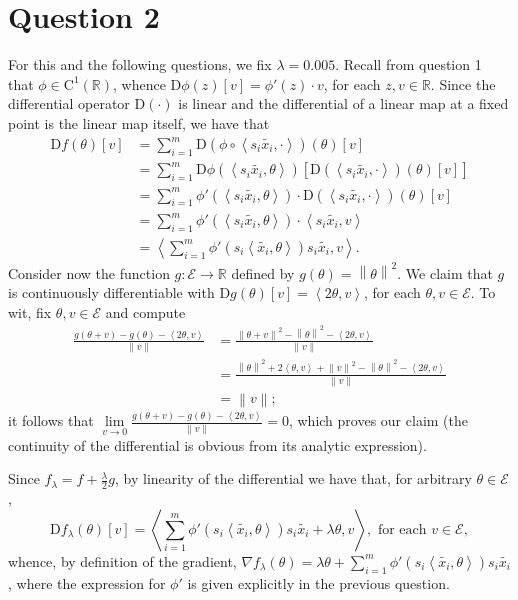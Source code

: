 \documentclass{article}
\theoremstyle{definition}
\theoremstyle{remark}
\newcommand{\R}{\mathbb{R}}
\newcommand \norm[1]{\left\lVert #1 \right\rVert}
\newcommand\inn [2]{\left\langle #1{,}#2\right\rangle}
\newcommand{\D}{\mathrm D}
\begin{document}
\section*{Question 2}
For this and the following questions, we  fix $\lambda=0.005$.
Recall from question 1 that $\phi\in \mathrm C^1(\R)$, whence $\D \phi (z)[v]=\phi'(z)\cdot v$, for each $z,v\in \R$.
Since the differential operator $\D(\cdot)$ is linear and the differential of a linear map at a fixed point is the linear map itself, we have that
\begin{align*}
  \D f(\theta)[v] &= \sum_{i=1}^m  \D \left( \phi\circ \inn{s_i\tilde{x_i}}{\cdot} \right)(\theta)[v]\\
  &= \sum_{i=1}^m  \D \phi(\inn{s_i\tilde{x_i}}{\theta}) 
\left[ \D (\inn{s_i\tilde{x_i}}{\cdot})(\theta)[v] \right]\\
&= \sum_{i=1}^m   \phi'(\inn{s_i\tilde{x_i}}{\theta}) \cdot
 \D (\inn{s_i\tilde{x_i}}{\cdot})(\theta)[v] \\
&=  \sum_{i=1}^m   \phi'(\inn{s_i\tilde{x_i}}{\theta}) \cdot
  \inn{s_i\tilde{x_i}}{v}\\
  &=\inn{\sum_{i=1}^m  \phi'(s_i\inn{\tilde{x_i}}{\theta})s_i\tilde{x_i}}{v}.
\end{align*}
Consider now the function $g\colon \mathcal E\to \R$ defined by $g(\theta)=\norm \theta^2$. We claim that $g$ is continuously differentiable with $\D g(\theta)[v]=\inn {2\theta}{v}$, for each $\theta,v\in \mathcal E$. To wit, fix  $\theta,v\in \mathcal E$ and compute
\begin{align*}
\frac{g(\theta+v)-g(\theta)-\inn{2\theta}{v}}{\norm v} &= \frac{\norm{\theta+v}^2-\norm{\theta}^2-\inn{2\theta}{v}}{\norm v}\\
&=\frac{\norm \theta^2 +2\inn {\theta}{v}+\norm v^2-\norm \theta^2-\inn{2\theta}{v}}{\norm v}\\
&=\norm v;
\end{align*}
it follows that $\lim\limits_{v\to 0}\frac{g(\theta+v)-g(\theta)-\inn{2\theta}{v}}{\norm v}=0$, which proves our claim (the continuity of the differential is obvious from its analytic expression).

Since $f_\lambda=f+\frac \lambda 2 g$, by linearity of the differential we have that, for arbitrary $\theta\in \mathcal E$,
$$
\D f_\lambda(\theta)[v]=\inn{\sum_{i=1}^m   \phi'(s_i\inn{\tilde{x_i}}{\theta})s_i\tilde{x_i}+\lambda\theta}{v}, \text{ for each }v\in \mathcal E,
$$
whence, by definition of the gradient, $\nabla f_\lambda(\theta)=\lambda\theta+\sum_{i=1}^m   \phi'(s_i\inn{\tilde{x_i}}{\theta})s_i\tilde{x_i}$, where the expression for $\phi'$ is given explicitly in the previous question.
\end{document}
